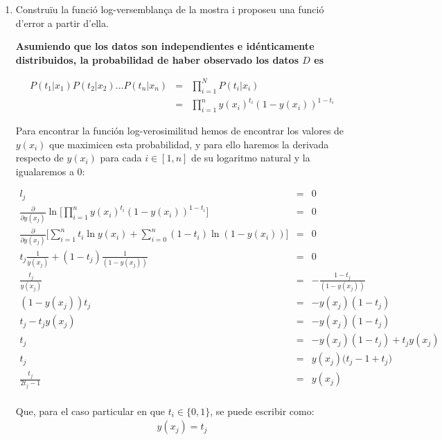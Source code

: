 \documentclass[a4paper]{article}
\begin{document}
\begin{enumerate}
  \item Construïu la funció log-versemblança de la mostra i proposeu una funció d'error a partir d'ella.

  {\bfseries
  Asumiendo que los datos son independientes e idénticamente distribuidos, la probabilidad de haber observado los datos $D$ es

  \begin{eqnarray*}
    P(t_1 | x_1 )P(t_2 | x_2 )\dots P(t_n | x_n ) &=& \prod_{i = 1}^{N} P(t_i | x_i ) \\
    &=& \prod_{i = 1}^{n} y(x_i)^{t_i} (1 - y(x_i))^{1-t_i}
  \end{eqnarray*}

  Para encontrar la función log-verosimilitud hemos de encontrar los valores de
  $y(x_i)$ que maximicen esta probabilidad, y para ello haremos la derivada respecto
  de $y(x_i)$ para cada $i \in [1, n]$ de su logaritmo
  natural y la igualaremos a $0$:

  \begin{eqnarray*}
    l_j &=& 0 \\
%
    \frac{\partial}{\partial y(x_j)}
    \ln
    \Big[
     \prod_{i = 1}^{n} y(x_i)^{t_i} (1 - y(x_i))^{1-t_i}
    \Big] &=& 0 \\
    \frac{\partial}{\partial y(x_j)}
    \Big[
    \sum_{i = 1}^{n} t_i\ln
        y(x_i)
     +
    \sum_{i = 0}^{n} (1-t_i)\ln
        (1 - y(x_i))
    \Big] &=& 0\\
    t_j\frac{1}{y(x_j)}
     +
     (1-t_j)\frac{1}{(1 - y(x_j))} &=& 0 \\
    \frac{t_j}{y(x_j)}
     &=&
     -\frac{1-t_j}{(1 - y(x_j))} \\
     (1 - y(x_j))t_j
      &=&
      -y(x_j)(1-t_j) \\
      t_j - t_jy(x_j)
      &=&
      -y(x_j)(1-t_j) \\
      t_j
      &=&
      -y(x_j)(1-t_j) + t_jy(x_j)\\
      t_j
      &=&
      y(x_j)
      \big(
        t_j - 1 + t_j
      \big) \\
      \frac{t_j}{2t_j - 1}
      &=&
      y(x_j) \\
  \end{eqnarray*}

  Que, para el caso particular en que $t_i \in \{0, 1\}$, se puede escribir
  como:
  \begin{eqnarray*}
    y(x_j) = t_j
  \end{eqnarray*}

}
\end{enumerate}
\end{document}
